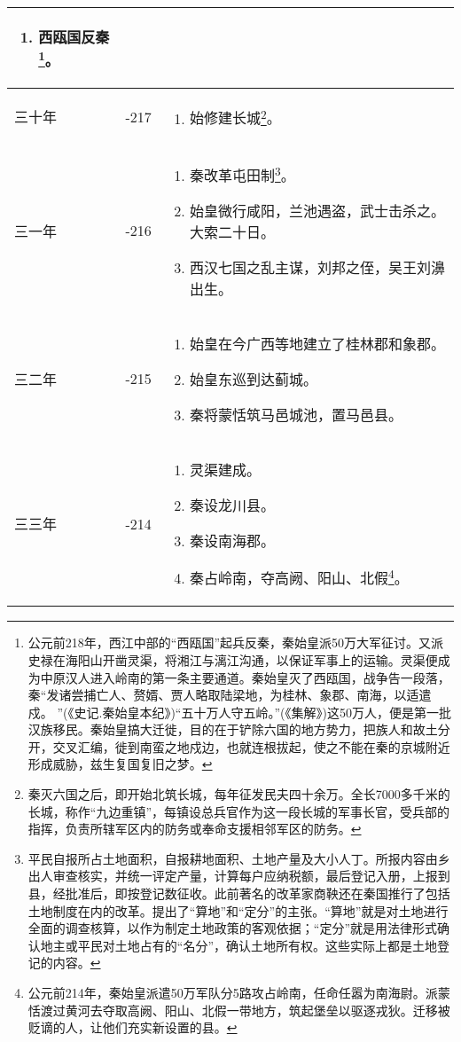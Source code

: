 \begin{longtable}{|>{\centering\scriptsize}m{2em}|>{\centering\small}m{2em}|>{\centering}m{8.3em}|}
\begin{enumerate}
  \item 西瓯国反秦\footnote{公元前218年，西江中部的“西瓯国”起兵反秦，秦始皇派50万大军征讨。又派史禄在海阳山开凿灵渠，将湘江与漓江沟通，以保证军事上的运输。灵渠便成为中原汉人进入岭南的第一条主要通道。秦始皇灭了西瓯国，战争告一段落，秦“发诸尝捕亡人、赘婿、贾人略取陆梁地，为桂林、象郡、南海，以适遣戍。 ”(《史记.秦始皇本纪》)“五十万人守五岭。”(《集解》)这50万人，便是第一批汉族移民。秦始皇搞大迁徙，目的在于铲除六国的地方势力，把族人和故土分开，交叉汇编，徙到南蛮之地戍边，也就连根拔起，使之不能在秦的京城附近形成威胁，兹生复国复旧之梦。}。
  \end{enumerate} \tabularnewline\hline
  三十年 & -217 & \begin{enumerate}
    \tiny
  \item 始修建长城\footnote{秦灭六国之后，即开始北筑长城，每年征发民夫四十余万。全长7000多千米的长城，称作“九边重镇”，每镇设总兵官作为这一段长城的军事长官，受兵部的指挥，负责所辖军区内的防务或奉命支援相邻军区的防务。}。
  \end{enumerate} \tabularnewline\hline
  三一年 & -216 & \begin{enumerate}
    \tiny
  \item 秦改革屯田制\footnote{平民自报所占土地面积，自报耕地面积、土地产量及大小人丁。所报内容由乡出人审查核实，并统一评定产量，计算每户应纳税额，最后登记入册，上报到县，经批准后，即按登记数征收。此前著名的改革家商鞅还在秦国推行了包括土地制度在内的改革。提出了“算地”和“定分”的主张。“算地”就是对土地进行全面的调查核算，以作为制定土地政策的客观依据；“定分”就是用法律形式确认地主或平民对土地占有的“名分”，确认土地所有权。这些实际上都是土地登记的内容。}。
  \item 始皇微行咸阳，兰池遇盗，武士击杀之。大索二十日。
  \item 西汉七国之乱主谋，刘邦之侄，吴王刘濞出生。
  \end{enumerate} \tabularnewline\hline
  三二年 & -215 & \begin{enumerate}
    \tiny
  \item 始皇在今广西等地建立了桂林郡和象郡。
  \item 始皇东巡到达蓟城。
  \item 秦将蒙恬筑马邑城池，置马邑县。
  \end{enumerate} \tabularnewline\hline
  三三年 & -214 & \begin{enumerate}
    \tiny
  \item 灵渠建成。
  \item 秦设龙川县。
  \item 秦设南海郡。
  \item 秦占岭南，夺高阙、阳山、北假\footnote{公元前214年，秦始皇派遣50万军队分5路攻占岭南，任命任嚣为南海尉。派蒙恬渡过黄河去夺取高阙、阳山、北假一带地方，筑起堡垒以驱逐戎狄。迁移被贬谪的人，让他们充实新设置的县。}。

\end{enumerate}
\end{longtable}
